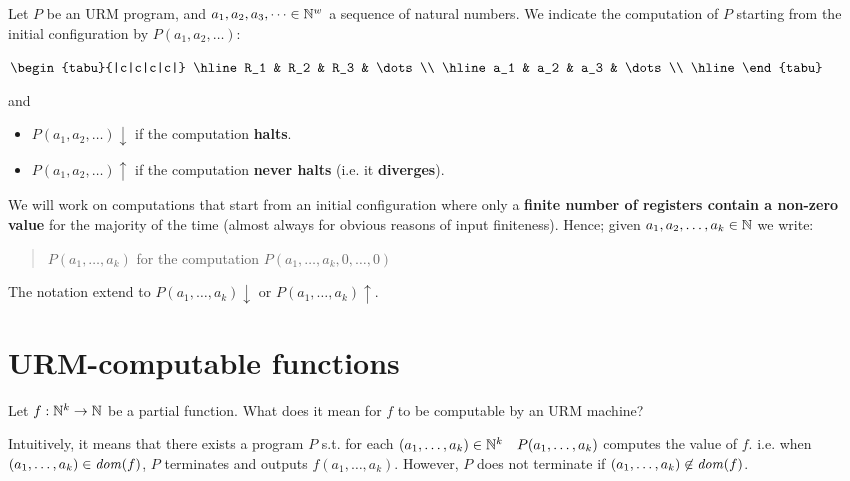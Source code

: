 \begin{notation}
  Let $P$ be an URM program, and $a_1,a_2,a_3,\dots \in \mathbb{N}^w$ a sequence
  of natural numbers. We indicate the computation of $P$ starting from the
  initial configuration by $P(a_1,a_2,\dots)$:

  \begin{center}
    $\begin{tabu}{|c|c|c|c|}
      \hline
      R_1 & R_2 & R_3 & \dots \\
      \hline
      a_1 & a_2 & a_3 & \dots \\
      \hline
    \end{tabu}$
  \end{center}

  and

  \begin{itemize}
  \item $P(a_1,a_2,\dots) \downarrow$ if the computation \textbf{halts}.
  \item $P(a_1,a_2,\dots) \uparrow$ if the computation \textbf{never
      halts} (i.e. it \textbf{diverges}).
  \end{itemize}


  We will work on computations that start from an initial configuration
  where only a \textbf{finite number of registers contain a non-zero value} for
  the majority of the time (almost always for obvious reasons of input
  finiteness). Hence; given $a_1,a_2,\dots,a_k \in \mathbb{N}$ we write:

  \begin{quote}
    $P(a_1,\dots,a_k)$ for the computation
    $P(a_1,\dots,a_k,0,\dots,0)$
  \end{quote}
  The notation extend to $P(a_1,\dots,a_k)\downarrow$ or
  $P(a_1,\dots,a_k)\uparrow$.
\end{notation}

\section{URM-computable functions}

Let $f : \mathbb{N}^k \rightarrow \mathbb{N}$ be a partial function. What does it mean for  $f$ to be computable by an URM machine?

Intuitively, it means that there exists a program $P$ s.t. for each $(a_1,\dots,a_k) \in \mathbb{N}^k \quad P(a_1,\dots,a_k)$ computes the value of $f$. i.e. when $(a_1,\dots,a_k)  \in \mathit{dom}({f})$, $P$ terminates and outputs $f(a_1, \ldots, a_k)$. However, $P$ does not terminate if $(a_1,\dots,a_k) \not\in \mathit{dom}({f})$.

